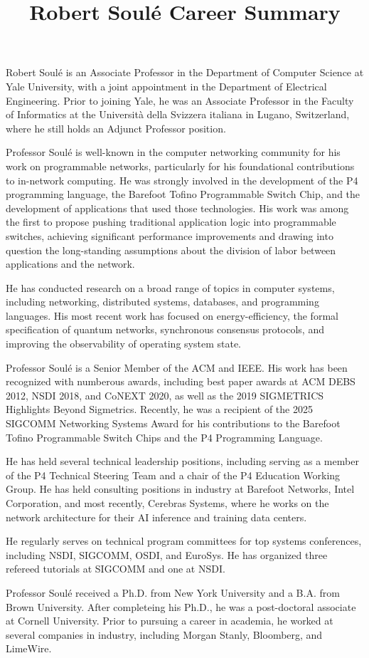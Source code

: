 \documentclass[11pt]{article}
\title{ Robert Soul\'{e} Career Summary}
\author{  }
\date{ }
\begin{document}
\maketitle	
\thispagestyle{empty}


Robert Soul\'{e} is an Associate Professor in the Department of
Computer Science at Yale University, with a joint appointment in the
Department of Electrical Engineering. Prior to joining Yale, he was an
Associate Professor in the Faculty of Informatics at the
Universit\`{a} della Svizzera italiana in Lugano, Switzerland, where
he still holds an Adjunct Professor position.


Professor Soul\'{e} is well-known in the computer networking community
for his work on programmable networks, particularly for his
foundational contributions to in-network computing. He was strongly
involved in the development of the P4 programming language, the
Barefoot Tofino Programmable Switch Chip, and the development of
applications that used those technologies.  His work was among the
first to propose pushing traditional application logic into
programmable switches, achieving significant performance improvements
and drawing into question the long-standing assumptions about the
division of labor between applications and the network.

He has conducted research on a broad range of topics in computer
systems, including networking, distributed systems, databases, and
programming languages. His most recent work has focused on
energy-efficiency, the formal specification of quantum networks,
synchronous consensus protocols, and improving the observability
of operating system state.


Professor Soul\'{e} is a Senior Member of the ACM and IEEE. His work
has been recognized with numberous awards, including best paper awards
at ACM DEBS 2012, NSDI 2018, and CoNEXT 2020, as well as the 2019
SIGMETRICS Highlights Beyond Sigmetrics. Recently, he was a recipient
of the 2025 SIGCOMM Networking Systems Award for his contributions to
the Barefoot Tofino Programmable Switch Chips and the P4 Programming
Language.


He has held several technical leadership positions, including
serving as a member of the P4 Technical Steering Team and a chair of
the P4 Education Working Group. He has held consulting positions in
industry at Barefoot Networks, Intel Corporation, and most recently,
Cerebras Systems, where he works on the network architecture for their
AI inference and training data centers.

He regularly serves on technical program committees for top systems
conferences, including NSDI, SIGCOMM, OSDI, and EuroSys. He has
organized three refereed tutorials at SIGCOMM and one at NSDI.


Professor Soul\'{e} received a Ph.D. from New York University and a
B.A. from Brown University. After completeing his Ph.D., he was a
post-doctoral associate at Cornell University. Prior to pursuing a
career in academia, he worked at several companies in industry,
including Morgan Stanly, Bloomberg, and LimeWire.
\end{document}
